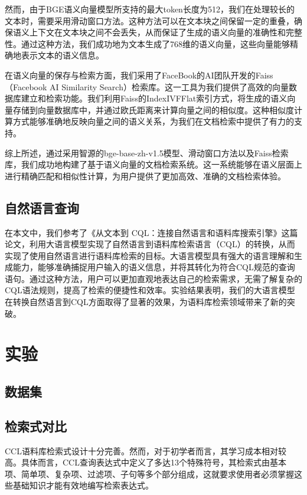 \documentclass[11pt]{article}
\begin{document}
\begin{CJK*}{UTF8}{gbsn}
然而，由于BGE语义向量模型所支持的最大token长度为512，我们在处理较长的文本时，需要采用滑动窗口方法。这种方法可以在文本块之间保留一定的重叠，确保语义上下文在文本块之间不会丢失，从而保证了生成的语义向量的准确性和完整性。通过这种方法，我们成功地为文本生成了768维的语义向量，这些向量能够精确地表示文本的语义信息。

在语义向量的保存与检索方面，我们采用了FaceBook的AI团队开发的Faiss（Facebook AI Similarity Search）检索库。这一工具为我们提供了高效的向量数据库建立和检索功能。我们利用Faiss的IndexIVFFlat索引方式，将生成的语义向量存储到向量数据库中，并通过欧氏距离来计算向量之间的相似度。这种相似度计算方式能够准确地反映向量之间的语义关系，为我们在文档检索中提供了有力的支持。

综上所述，通过采用智源的bge-base-zh-v1.5模型、滑动窗口方法以及Faiss检索库，我们成功地构建了基于语义向量的文档检索系统。这一系统能够在语义层面上进行精确匹配和相似性计算，为用户提供了更加高效、准确的文档检索体验。

\subsection{自然语言查询}

在本文中，我们参考了《从文本到 CQL：连接自然语言和语料库搜索引擎》这篇论文，利用大语言模型实现了自然语言到语料库检索语言（CQL）的转换，从而实现了使用自然语言进行语料库检索的目标。大语言模型具有强大的语言理解和生成能力，能够准确捕捉用户输入的语义信息，并将其转化为符合CQL规范的查询语句。通过这种方法，用户可以更加直观地表达自己的检索需求，无需了解复杂的CQL语法规则，提高了检索的便捷性和效率。实验结果表明，我们的大语言模型在转换自然语言到CQL方面取得了显著的效果，为语料库检索领域带来了新的突破。

\section{实验}

\subsection{数据集}


\subsection{检索式对比}

CCL语料库检索式设计十分完善。然而，对于初学者而言，其学习成本相对较高。具体而言，CCL查询表达式中定义了多达13个特殊符号，其检索式由基本项、简单项、复杂项、过滤项、子句等多个部分组成，这就要求使用者必须掌握这些基础知识才能有效地编写检索表达式。


\end{CJK*}
\end{document}
